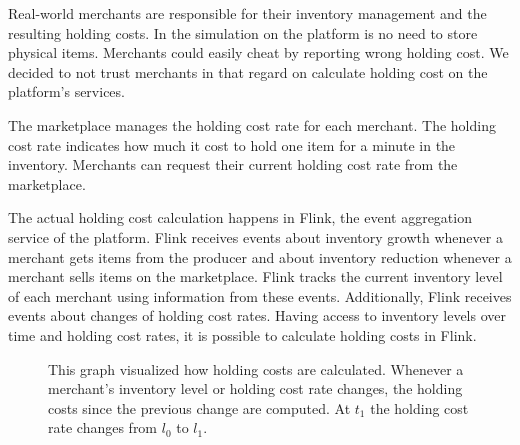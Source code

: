 Real-world merchants are responsible for their inventory management and the resulting holding costs.
In the simulation on the \pricewars platform is no need to store physical items.
Merchants could easily cheat by reporting wrong holding cost.
We decided to not trust merchants in that regard on calculate holding cost on the platform's services.

The marketplace manages the holding cost rate for each merchant.
The holding cost rate indicates how much it cost to hold one item for a minute in the inventory.
Merchants can request their current holding cost rate from the marketplace.

The actual holding cost calculation happens in Flink, the event aggregation service of the \pricewars platform.
Flink receives events about inventory growth whenever a merchant gets items from the producer and about inventory reduction whenever a merchant sells items on the marketplace.
Flink tracks the current inventory level of each merchant using information from these events.
Additionally, Flink receives events about changes of holding cost rates.
Having access to inventory levels over time and holding cost rates, it is possible to calculate holding costs in Flink.

\begin{figure}[t]
\centering
{}
\caption{
	This graph visualized how holding costs are calculated.
	Whenever a merchant's inventory level or holding cost rate changes, the holding costs since the previous change are computed.
	At $t_1$ the holding cost rate changes from $l_0$ to $l_1$.}
\label{fig:holding_cost}
\end{figure}


